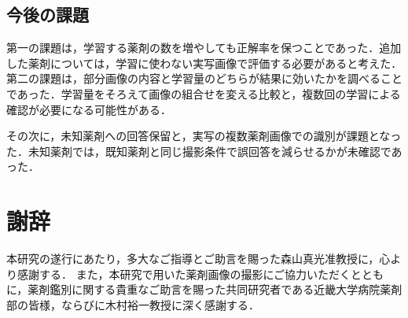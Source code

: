 \documentclass[uplatex,dvipdfmx]{jsarticle}
\begin{document}
\subsection{今後の課題}

第一の課題は，学習する薬剤の数を増やしても正解率を保つことであった．追加した薬剤については，学習に使わない実写画像で評価する必要があると考えた．
第二の課題は，部分画像の内容と学習量のどちらが結果に効いたかを調べることであった．学習量をそろえて画像の組合せを変える比較と，複数回の学習による確認が必要になる可能性がある．

その次に，未知薬剤への回答保留と，実写の複数薬剤画像での識別が課題となった．未知薬剤では，既知薬剤と同じ撮影条件で誤回答を減らせるかが未確認であった．

\clearpage

\section*{謝辞}

本研究の遂行にあたり，多大なご指導とご助言を賜った森山真光准教授に，心より感謝する．
また，本研究で用いた薬剤画像の撮影にご協力いただくとともに，薬剤鑑別に関する貴重なご助言を賜った共同研究者である近畿大学病院薬剤部の皆様，ならびに木村裕一教授に深く感謝する．

\clearpage
{}

{\footnotesize
\raggedright


}
\end{document}
